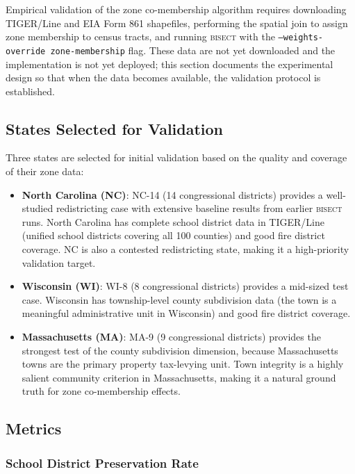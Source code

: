 \label{sec:experimental-design}

Empirical validation of the zone co-membership algorithm requires downloading
TIGER/Line and EIA Form 861 shapefiles, performing the spatial join to assign
zone membership to census tracts, and running \textsc{bisect} with the
\texttt{--weights-override zone-membership} flag.
These data are not yet downloaded and the implementation is not yet deployed;
this section documents the experimental design so that when the data becomes
available, the validation protocol is established.

\subsection{States Selected for Validation}

Three states are selected for initial validation based on the quality and coverage
of their zone data:

\begin{itemize}
  \item \textbf{North Carolina (NC)}: NC-14 (14 congressional districts) provides
    a well-studied redistricting case with extensive baseline results from earlier
    \textsc{bisect} runs.
    North Carolina has complete school district data in TIGER/Line (unified school
    districts covering all 100 counties) and good fire district coverage.
    NC is also a contested redistricting state, making it a high-priority validation
    target.
  \item \textbf{Wisconsin (WI)}: WI-8 (8 congressional districts) provides a
    mid-sized test case.
    Wisconsin has township-level county subdivision data (the town is a meaningful
    administrative unit in Wisconsin) and good fire district coverage.
  \item \textbf{Massachusetts (MA)}: MA-9 (9 congressional districts) provides the
    strongest test of the county subdivision dimension, because Massachusetts towns
    are the primary property tax-levying unit.
    Town integrity is a highly salient community criterion in Massachusetts, making
    it a natural ground truth for zone co-membership effects.
\end{itemize}

\subsection{Metrics}

\subsubsection{School District Preservation Rate}

